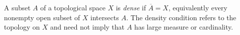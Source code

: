 
A subset $A$ of a topological space $X$ is \emph{dense} if $\overline A=X$, equivalently every nonempty open subset of $X$ intersects $A$. The density condition refers to the topology on $X$ and need not imply that $A$ has large measure or cardinality.
